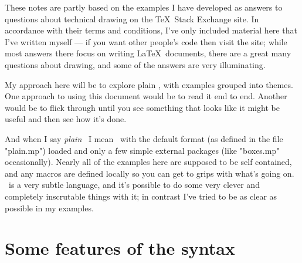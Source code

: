 \documentclass[a4paper,landscape]{article}
\begin{document}
These notes are partly based on the examples I have developed as answers
to questions about technical drawing on the \TeX\ Stack Exchange site.  In
accordance with their terms and conditions, I’ve only included material here that
I’ve written myself --- if you want other people’s code then visit the site;
while most answers there focus on writing \LaTeX\ documents, there are a great
many questions about drawing, and some of the answers are very illuminating.

My approach here will be to explore plain \MP, with examples grouped
into themes.  One approach to using this document would be to read it end to end.
Another would be to flick through until you see something that looks like it might
be useful and then see how it’s done.

And when I say \textit{plain} \MP\ I mean \MP\ with the default format (as defined
in the file "plain.mp") loaded and only a few simple external packages (like
"boxes.mp" occasionally).  Nearly all of the examples here are supposed to be self
contained, and any macros are defined locally so you can get to grips with what’s
going on.  \MP\ is a very subtle language, and it’s possible to do some very clever
and completely inscrutable things with it;  in contrast I’ve tried to be as clear as
possible in my examples.

\newpage
\section{Some features of the syntax}
\end{document}
